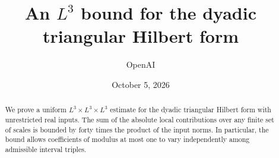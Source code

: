 \documentclass[11pt]{article}
\title{An \(L^3\) bound for the dyadic triangular Hilbert form}
\author{OpenAI}
\date{October 5, 2026}
\begin{document}
\maketitle
\begin{abstract}
We prove a uniform \(L^3\times L^3\times L^3\) estimate for the dyadic
triangular Hilbert form with unrestricted real inputs. The sum of the
absolute local contributions over any finite set of scales is bounded
by forty times the product of the input norms. In particular, the bound
allows coefficients of modulus at most one to vary independently among
admissible interval triples.
\end{abstract}







\end{document}
